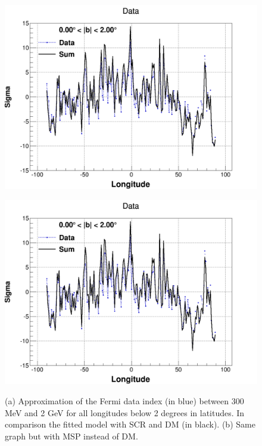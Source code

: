 \begin{figure}[h]
  \centering
  \begin{minipage}[h]{0.45\textwidth}
	  \centering
	  \includegraphics[width=\linewidth]{pic/results/MSPonly_weniger.png}	  
  	  \subcaption{}
	  \label{fig:DMonly_weniger}
  \end{minipage}
  \hfill
  \begin{minipage}[h]{0.45\textwidth}
	  \centering
	  \includegraphics[width=\linewidth]{pic/results/MSPonly_weniger.png}
	  \subcaption{}
  	  \label{fig:MSPonly_weniger}
  \end{minipage}
  \caption[DM and MSP spectral indexes graph.]{(a)  Approximation of the Fermi data index (in blue) between 300 MeV and 2 GeV for all longitudes below 2 degrees in latitudes. In comparison the fitted model with SCR and DM (in black). (b) Same graph but with MSP instead of DM.}
  \label{fig:DM_and_MSP_weniger}
\end{figure}


